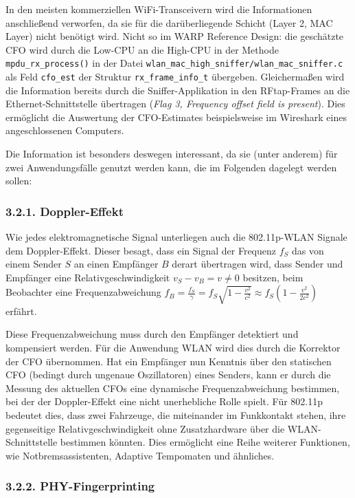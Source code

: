 \documentclass[ngerman,]{scrartcl}
\begin{document}
In den meisten kommerziellen WiFi-Transceivern wird die Informationen
anschließend verworfen, da sie für die darüberliegende Schicht (Layer 2,
MAC Layer) nicht benötigt wird. Nicht so im WARP Reference Design: die
geschätzte CFO wird durch die Low-CPU an die High-CPU in der Methode
\texttt{mpdu\_rx\_process()} in der Datei
\texttt{wlan\_mac\_high\_sniffer/wlan\_mac\_sniffer.c} als Feld
\texttt{cfo\_est} der Struktur \texttt{rx\_frame\_info\_t} übergeben.
Gleichermaßen wird die Information bereits durch die Sniffer-Applikation
in den RFtap-Frames an die Ethernet-Schnittstelle übertragen (\emph{Flag
3, Frequency offset field is present}). Dies ermöglicht die Auswertung
der CFO-Estimates beispielsweise im Wireshark eines angeschlossenen
Computers.

Die Information ist besonders deswegen interessant, da sie (unter
anderem) für zwei Anwendungsfälle genutzt werden kann, die im Folgenden
dagelegt werden sollen:

\subsubsection{3.2.1. Doppler-Effekt}\label{doppler-effekt}

Wie jedes elektromagnetische Signal unterliegen auch die 802.11p-WLAN
Signale dem Doppler-Effekt. Dieser besagt, dass ein Signal der Frequenz
\(f_S\) das von einem Sender \(S\) an einen Empfänger \(B\) derart
übertragen wird, dass Sender und Empfänger eine Relativgeschwindigkeit
\(v_S - v_B = v \neq 0\) besitzen, beim Beobachter eine
Frequenzabweichung
\(f_{B} = \frac{f_{S}}{\gamma} = f_{S} \sqrt{1-\frac{v^2}{c^2}} \approx f_{S} \left(1 - \frac{v^2}{2c^2}\right)\)
erfährt.

Diese Frequenzabweichung muss durch den Empfänger detektiert und
kompensiert werden. Für die Anwendung WLAN wird dies durch die Korrektor
der CFO übernommen. Hat ein Empfänger nun Kenntnis über den statischen
CFO (bedingt durch ungenaue Oszillatoren) eines Senders, kann er durch
die Messung des aktuellen CFOs eine dynamische Frequenzabweichung
bestimmen, bei der der Doppler-Effekt eine nicht unerhebliche Rolle
spielt. Für 802.11p bedeutet dies, dass zwei Fahrzeuge, die miteinander
im Funkkontakt stehen, ihre gegenseitige Relativgeschwindigkeit ohne
Zusatzhardware über die WLAN-Schnittstelle bestimmen könnten. Dies
ermöglicht eine Reihe weiterer Funktionen, wie Notbremsassistenten,
Adaptive Tempomaten und ähnliches.

\subsubsection{3.2.2. PHY-Fingerprinting}\label{phy-fingerprinting}
\end{document}
